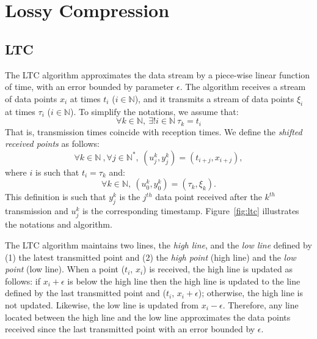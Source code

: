 \section{Lossy Compression}


\subsection{LTC}
\label{sec:ltc}
The LTC algorithm approximates the data stream by a piece-wise linear function of time, with
an error bounded by parameter $\epsilon$.  The algorithm receives a stream of data points $x_i$ at times $t_i$
($i \in \mathbb{N}$), and it transmits a stream of data points $\xi_i$ at times
$\tau_i$ ($i \in \mathbb{N}$). To simplify the notations, we assume that:
\begin{equation*}
\forall k \in \mathbb{N}, \  \exists ! i \in \mathbb{N} \  \tau_k = t_i
\end{equation*}
That is, transmission times coincide with reception times.
We define the \emph{shifted received points}  as follows:
\begin{equation*}
\forall k \in \mathbb{N}\ , \forall j \in \mathbb{N^*},\ (u^k_j, y^k_j) = (t_{i+j}, x_{i+j}), 
\end{equation*}
where $i$ is such that $t_i = \tau_k$ and:
\begin{equation*}
\forall k \in \mathbb{N},\  (u^k_0, y^k_0) = (\tau_k, \xi_k).
\end{equation*}
This definition is such that $y^k_j$ is the $j^{th}$ data point received
after the $k^{th}$ transmission and $u^k_j$ is the corresponding timestamp.
Figure~\ref{fig:ltc} illustrates the notations and algorithm. 

The LTC algorithm maintains two lines, the \emph{high line}, and the \emph{low
line} defined by (1) the latest transmitted point and (2) the \emph{high point}
(high line) and the \emph{low point} (low line). When a point ($t_i$, $x_i$) is
received, the high line is updated as follows: if $x_i+\epsilon$ is below the
high line then the high line is updated to the line defined by the last
transmitted point and ($t_i$, $x_i+\epsilon$); otherwise, the high line is not
updated. Likewise, the low line is updated from $x_i-\epsilon$. Therefore, any
line located between the high line and the low line approximates the data points
received since the last transmitted point with an error bounded by $\epsilon$.

